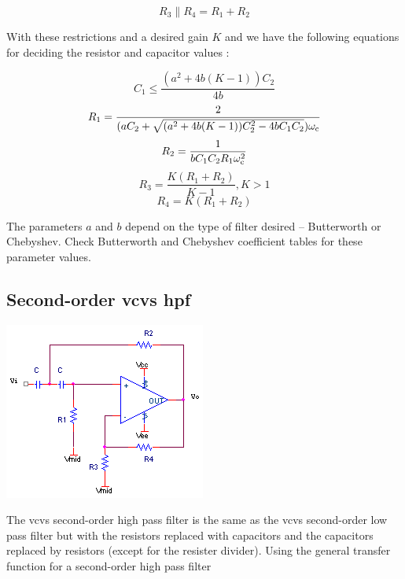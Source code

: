 \begin{equation}
R_3 \parallel R_4 = R_1 + R_2
\end{equation}

With these restrictions and a desired gain $K$ and \wcutoff we have the following equations for deciding the resistor and capacitor values \autocite[118-119]{op-amp-circuits-johnson}:

\begin{equation}
C_1 \leq \frac{(a^2 + 4b(K-1))C_2}{4b}
\end{equation}
\begin{equation}
R_1 = \frac{2}{(a C_2+\sqrt{(a^2 + 4b(K-1))C_2^2 - 4b C_1 C_2})\omega_\mathrm{c}}
\end{equation}
\begin{equation}
R_2 = \frac{1}{bC_1 C_2 R_1\omega_\mathrm{c}^2}
\end{equation}
\begin{equation}
R_3 = \frac{K(R_1 + R_2)}{K-1}, K > 1
\end{equation}
\begin{equation}
R_4 = K(R_1 + R_2)
\end{equation}

The parameters $a$ and $b$ depend on the type of filter desired -- Butterworth or Chebyshev.
Check Butterworth and Chebyshev coefficient tables for these parameter values.

\subsection{Second-order \acs{vcvs} \acl{hpf}}
\begin{center}
	\includegraphics{schematics/2ndorder_vcvs_HPfilter.PNG}
\end{center}
The \ac{vcvs} second-order high pass filter is the same as the \ac{vcvs} second-order low pass filter but with the resistors replaced with capacitors and the capacitors replaced by resistors (except for the resister divider). Using the  general transfer function for a second-order high pass filter


